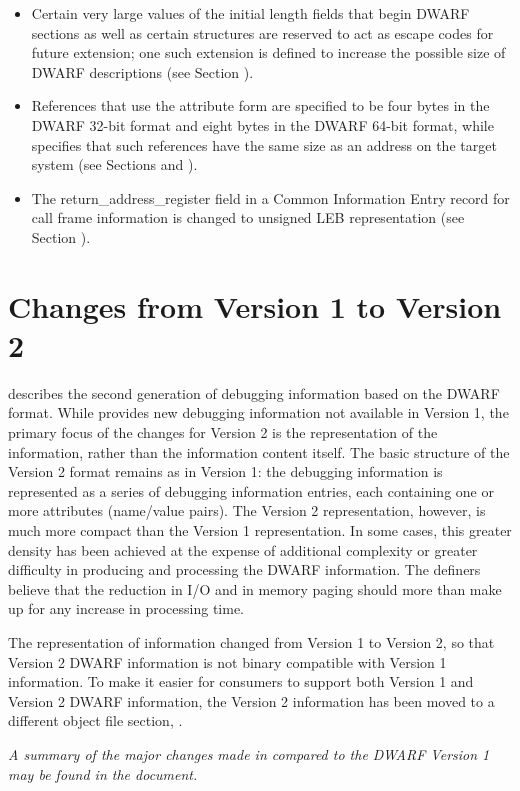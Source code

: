 \begin{itemize}
\item
Certain very large values of the initial length fields that
begin DWARF sections as well as certain structures are reserved
to act as escape codes for future extension; one such extension
is defined to increase the possible size of DWARF descriptions
(see Section ).

\item
References that use the attribute form 
are specified to be four bytes in the DWARF 32-bit format and
eight bytes in the DWARF 64-bit format, while 
specifies that such references have the same size as an
address on the target system (see Sections 
 and 
).

\item
The return\_address\_register field in a Common Information
Entry record for call frame information is changed to unsigned
LEB representation (see Section 
).

\end{itemize}


\section{Changes from Version 1 to Version 2}
describes the second generation of debugging
information based on the DWARF format. While 
provides new debugging information not available in
Version 1, the primary focus of the changes for Version
2 is the representation of the information, rather than
the information content itself. The basic structure of
the Version 2 format remains as in Version 1: the debugging
information is represented as a series of debugging information
entries, each containing one or more attributes (name/value
pairs). The Version 2 representation, however, is much more
compact than the Version 1 representation. In some cases,
this greater density has been achieved at the expense of
additional complexity or greater difficulty in producing and
processing the DWARF information. The definers believe that the
reduction in I/O and in memory paging should more than make
up for any increase in processing time.  

The representation
of information changed from Version 1 to Version 2, so that
Version 2 DWARF information is not binary compatible with
Version 1 information. To make it easier for consumers to
support both Version 1 and Version 2 DWARF information, the
Version 2 information has been moved to a different object
file section, \dotdebuginfo{}.  

\textit{
A summary of the major changes made in 
compared to the DWARF Version 1 may be found in the 
document.
}

